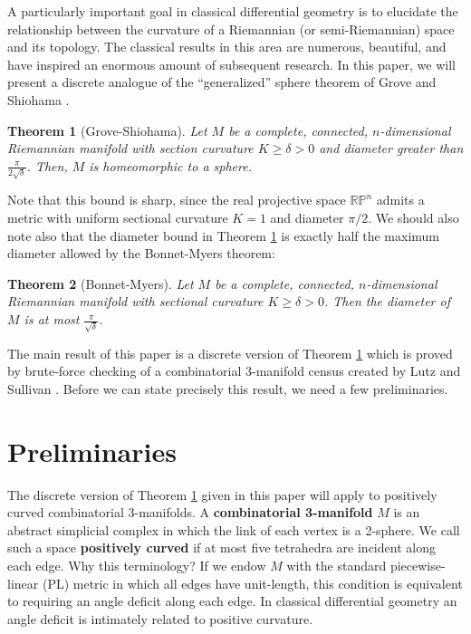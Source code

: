\documentclass[12pt]{article}
\newtheorem{thm}{Theorem}[section]
\begin{document}
A particularly important goal in classical differential geometry is to elucidate the relationship between the curvature of a Riemannian (or semi-Riemannian) space and its topology. The classical
results in this area are numerous, beautiful, and have inspired an
enormous amount of subsequent research. In this paper, we will present a discrete analogue of the ``generalized'' sphere theorem of Grove and Shiohama \cite{groveshiohama}.

\begin{thm}[Grove-Shiohama] Let $M$ be a complete, connected, $n$-dimensional Riemannian manifold with section curvature $K \geq \delta > 0$ and diameter greater than $\frac{\pi}{2\sqrt{\delta}}$. Then, $M$ is homeomorphic to a sphere.
\label{thm:grove_shiohama}
\end{thm}

\noindent Note that this bound is sharp, since the real projective space $\mathbb{RP}^n$ admits a metric with uniform sectional curvature $K=1$ and diameter $\pi/2$. We should also note also that the diameter bound in Theorem \ref{thm:grove_shiohama} is exactly half the maximum diameter allowed by the Bonnet-Myers theorem:

\begin{thm}[Bonnet-Myers] Let $M$ be a complete, connected, $n$-dimensional Riemannian manifold with sectional curvature $K \geq \delta > 0$. Then the diameter of $M$ is at most $\frac{\pi}{\sqrt{\delta}}$.
\label{thm:bonnet_myers}
\end{thm}

\noindent The main result of this paper is a discrete version of Theorem \ref{thm:grove_shiohama} which is proved by brute-force checking of a combinatorial 3-manifold census created by Lutz and Sullivan \cite{LS}. Before we can state precisely this result, we need a few preliminaries.

\section{Preliminaries}
\label{sect:basics}

The discrete version of Theorem \ref{thm:grove_shiohama} given in this paper will apply to positively curved combinatorial 3-manifolds. A \textbf{combinatorial 3-manifold} $M$ is an abstract simplicial complex in which the link of each vertex is a 2-sphere. We call such a space \textbf{positively curved} if at most five tetrahedra are incident along each edge. Why this terminology? If we endow $M$ with the standard piecewise-linear (PL) metric in which all edges have unit-length, this condition is equivalent to requiring an angle deficit along each edge. In classical differential geometry an angle deficit is intimately related to positive curvature.
\end{document}
